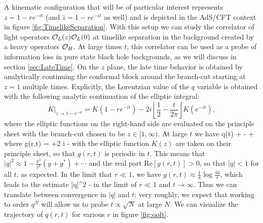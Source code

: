 A kinematic configuration that will be of particular interest represents $z = 1 - r e^{-i t}$  (and $\bar z = 1 - r e^{-it}$ as well) and is  depicted in the AdS/CFT context in figure \ref{fig:TimelikeSeparation}.   With this setup we can study the correlator of light operators ${\cal O}_L(z) {\cal O}_L(0)$ at timelike separation in the background created by a heavy operators ${\cal O}_H$.  At large times $t$, this correlator can be used as a probe of information loss in pure state black hole backgrounds, as we will discuss in section \ref{sec:LateTime}.  On the $z$ plane, the late time behavior is obtained by analytically continuing the conformal block around the branch-cut starting at $z=1$ multiple times. Explicitly, the Lorentzian value of the $q$ variable is obtained with the following analytic continuation of the elliptic integral: 
\begin{equation}
\left.K\right|_{z\rightarrow1-e^{-it}}=K(1-re^{-it})-2i \left\lfloor \frac{1}{2}-\frac{t}{2\pi}\right\rfloor K(e^{-it}),
\end{equation}
where the elliptic functions on the right-hand side are evaluated on the principle sheet with the branch-cut chosen to be $z\in[1,\infty)$. At large $t$ we have
\be
q(t)  +  -  + \cdots 
\label{eq:LargeTimeqApprox}
\ee
where
\be
g(r,t) = +2 i \left\lfloor {}\right\rfloor - 
\ee
with the elliptic function $K(z)$ are taken on their principle sheet, so that $g(r,t)$ is periodic in $t$.    This means that $|q|^2 \approx 1 - \frac{\pi^3}{t^2} (g + g^*) + \cdots$ and the real part Re$[g(r,t)] > 0$, so that $|q| < 1$ for all $t$, as expected.  In the limit that $r \ll 1$, we have $g(r,t) \approx \frac{1}{\pi} \log \frac{16}{r}$, which leads to the estimate  
\be
|q|^2  - 
\ee
in the limit of $r \ll 1$ and $t \to \infty$.  Thus we can translate between convergence in $|q|$ and $t$; very roughly, we expect that working to order $q^N$ will allow us to probe $t \propto \sqrt{N}$ at large $N$.  We can visualize the trajectory of $q(r,t)$ for various $r$ in figure \ref{fig:qoft}.



